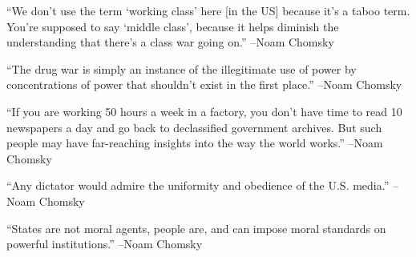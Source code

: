 \documentclass{article}%
\begin{document}
\begin{minipage}{\textwidth}%
\flushleft%
“We don't use the term ‘working class’ here {[}in the US{]} because it's a taboo term. You're supposed to say ‘middle class’, because it helps diminish the understanding that there's a class war going on.”%
\linebreak%
\vspace{1mm}%
–Noam Chomsky%
\linebreak%
\vspace{1mm}%
\end{minipage}%
\linebreak%
\vspace{1mm}%
\begin{minipage}{\textwidth}%
\flushleft%
“The drug war is simply an instance of the illegitimate use of power by concentrations of power that shouldn't exist in the first place.”%
\linebreak%
\vspace{1mm}%
–Noam Chomsky%
\linebreak%
\vspace{1mm}%
\end{minipage}%
\linebreak%
\vspace{1mm}%
\begin{minipage}{\textwidth}%
\flushleft%
“If you are working 50 hours a week in a factory, you don't have time to read 10 newspapers a day and go back to declassified government archives. But such people may have far{-}reaching insights into the way the world works.”%
\linebreak%
\vspace{1mm}%
–Noam Chomsky%
\linebreak%
\vspace{1mm}%
\end{minipage}%
\linebreak%
\vspace{1mm}%
\begin{minipage}{\textwidth}%
\flushleft%
“Any dictator would admire the uniformity and obedience of the U.S. media.”%
\linebreak%
\vspace{1mm}%
–Noam Chomsky%
\linebreak%
\vspace{1mm}%
\end{minipage}%
\linebreak%
\vspace{1mm}%
\begin{minipage}{\textwidth}%
\flushleft%
“States are not moral agents, people are, and can impose moral standards on powerful institutions.”%
\linebreak%
\vspace{1mm}%
–Noam Chomsky%
\linebreak%
\vspace{1mm}%
\end{minipage}%
\end{document}
